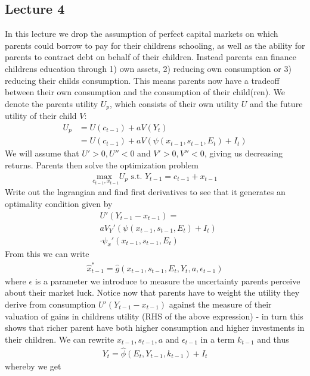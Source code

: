 \documentclass[12pt, a4paper]{article}
\begin{document}
\begin{multicols}{2}
\subsection{Lecture 4}
In this lecture we drop the assumption of perfect capital markets on which parents could borrow to pay for their childrens schooling, as well as the ability for parents to contract debt on behalf of their children. Instead parents can finance childrens education through 1) own assets, 2) reducing own consumption or 3) reducing their childs consumption. This means parents now have a tradeoff between their own consumption and the consumption of their child(ren). We denote the parents utility $U_p$, which consists of their own utility $U$ and the future utility of their child $V$:
\begin{align*}
U_p &= U(c_{t-1}) + aV(Y_t) \\
&= U(c_{t-1}) + aV(\psi(x_{t-1},s_{t-1},E_t) + I_t)
\end{align*}
We will assume that $U'>0, U''<0$ and $V'>0, V''<0$, giving us decreasing returns. Parents then solve the optimization problem 
\begin{align*}
\underset{c_{t-1}, x_{t-1}}{\text{max }} U_p \text{ s.t. } Y_{t-1} = c_{t-1} + x_{t-1}
\end{align*}
Write out the lagrangian and find first derivatives to see that it generates an optimality condition given by 
\begin{align*}
&U'(Y_{t-1} -x_{t-1}) =\\
&aV_{Y}'(\psi(x_{t-1},s_{t-1},E_t)+I_t) \\
& \cdot \psi_x'(x_{t-1},s_{t-1},E_t)
\end{align*}
From this we can write 
\begin{align*}
\hat{x}_{t-1}^* = \hat{g}(x_{t-1},s_{t-1},E_t, Y_t, a, \epsilon_{t-1})
\end{align*}
where $\epsilon$ is a parameter we introduce to measure the uncertainty parents perceive about their market luck. Notice now that parents have to weight the utility they derive from consumption $U'(Y_{t-1} -x_{t-1})$ against the measure of their valuation of gains in childrens utility (RHS of the above expression) - in turn this shows that richer parent have both higher consumption and higher investments in their children. We can rewrite $x_{t-1},s_{t-1},a$ and $\epsilon_{t-1}$ in a term $k_{t-1}$ and thus 
\begin{align*}
Y_t = \hat{\phi} (E_t, Y_{t-1}, k_{t-1})+I_t
\end{align*}
whereby we get 

\end{multicols}
\end{document}
